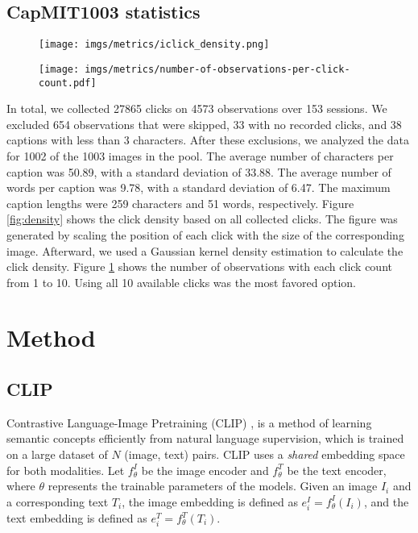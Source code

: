 \documentclass{article}
\begin{document}
\subsection{CapMIT1003 statistics}

\begin{figure}[!tbp]
  \centering
  \begin{minipage}[b]{0.43\textwidth}
    \texttt{[image: imgs/metrics/iclick\_density.png]}
    \label{fig:density}
  \end{minipage}
  \hfill
  \begin{minipage}[b]{0.49\textwidth}
    \texttt{[image: imgs/metrics/number-of-observations-per-click-count.pdf]}
    \label{fig:click_count}
  \end{minipage}
\end{figure}


In total, we collected 27865 clicks on 4573 observations over 153 sessions.
We excluded 654 observations that were skipped, 33 with no recorded clicks, and 38 captions with less than 3 characters. After these exclusions, we analyzed the data for 1002 of the 1003 images in the pool.
The average number of characters per caption was 50.89, with a standard deviation of 33.88. The average number of words per caption was 9.78, with a standard deviation of 6.47. The maximum caption lengths were 259 characters and 51 words, respectively. Figure \ref{fig:density} shows the click density based on all collected clicks. The figure was generated by scaling the position of each click with the size of the corresponding image. Afterward, we used a Gaussian kernel density estimation to calculate the click density. Figure \ref{fig:click_count} shows the number of observations with each click count from 1 to 10. Using all 10 available clicks was the most favored option. 

\section{Method}

\subsection{CLIP}
Contrastive Language-Image Pretraining (CLIP) \cite{radford2021learning}, is a method of learning semantic concepts efficiently from natural language supervision, which is trained on a large dataset of $N$ (image, text) pairs. CLIP uses a \textit{shared} embedding space for both modalities. Let $f_{\theta}^{I}$ be the image encoder and $f_{\theta}^{T}$ be the text encoder, where $\theta$ represents the trainable parameters of the models. Given an image $I_i$ and a corresponding text $T_i$, the image embedding is defined as $e_i^I=f_{\theta}^{I}(I_i)$, and the text embedding is defined as $e_i^T=f_{\theta}^{T}(T_i)$. 
\end{document}
